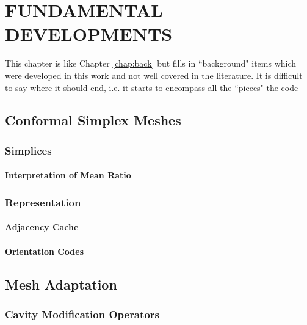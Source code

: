 
\chapter{FUNDAMENTAL DEVELOPMENTS}

This chapter is like Chapter \ref{chap:back} but
fills in ``background" items which were developed in
this work and not well covered in the literature.
It is difficult to say where it should end, i.e.
it starts to encompass all the ``pieces" the code

\section{Conformal Simplex Meshes}

\subsection{Simplices}

\subsubsection{Interpretation of Mean Ratio}

\subsection{Representation}

\subsubsection{Adjacency Cache}

\subsubsection{Orientation Codes}

\section{Mesh Adaptation}

\subsection{Cavity Modification Operators}

